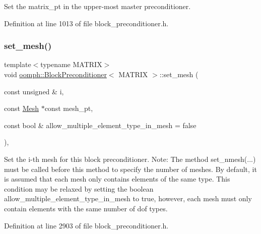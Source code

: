 Set the matrix\+\_\+pt in the upper-\/most master preconditioner. 



Definition at line 1013 of file block\+\_\+preconditioner.\+h.

\mbox{\label{classoomph_1_1BlockPreconditioner_af97821621b570d409e6662939e5f818d}} 
\subsubsection{\texorpdfstring{set\+\_\+mesh()}{set\_mesh()}}
{\footnotesize\ttfamily template$<$typename M\+A\+T\+R\+IX$>$ \\
void \hyperlink{classoomph_1_1BlockPreconditioner}{oomph\+::\+Block\+Preconditioner}$<$ M\+A\+T\+R\+IX $>$\+::set\+\_\+mesh (\begin{DoxyParamCaption}\item[{const unsigned \&}]{i,  }\item[{const \hyperlink{classoomph_1_1Mesh}{Mesh} $\ast$const}]{mesh\+\_\+pt,  }\item[{const bool \&}]{allow\+\_\+multiple\+\_\+element\+\_\+type\+\_\+in\+\_\+mesh = {\ttfamily false} }\end{DoxyParamCaption})\hspace{0.3cm}{\ttfamily [inline]}, {\ttfamily [protected]}}



Set the i-\/th mesh for this block preconditioner. Note\+: The method set\+\_\+nmesh(...) must be called before this method to specify the number of meshes. By default, it is assumed that each mesh only contains elements of the same type. This condition may be relaxed by setting the boolean allow\+\_\+multiple\+\_\+element\+\_\+type\+\_\+in\+\_\+mesh to true, however, each mesh must only contain elements with the same number of dof types. 



Definition at line 2903 of file block\+\_\+preconditioner.\+h.

\mbox{\label{classoomph_1_1BlockPreconditioner_ae055f998f6145656352aacac22e545ad}} 
